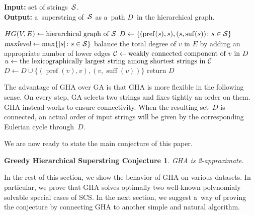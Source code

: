\documentclass[11pt,letterpaper]{article}
\DeclareMathOperator{\pref}{pref}
\DeclareMathOperator{\suff}{suff}
\begin{document}
\begin{algorithm}
\label{algo:gha}
\caption{Greedy Hierarchical Algorithm (GHA)}
\hspace*{\algorithmicindent} \textbf{Input:} set of strings~${\cal S}$.\\
\hspace*{\algorithmicindent} \textbf{Output:} a~superstring of~${\cal S}$ as a~path $D$~in the hierarchical graph.
\begin{algorithmic}[1]
\State $HG(V,E) \gets \text{hierarchical graph of ${\cal S}$}$ 
\State $D \gets \{(\operatorname{pref}(s), s), (s, \operatorname{suf}(s)) \colon s \in {\cal S}\}$\\
$\textsl{maxlevel} \gets \max\{|s| \colon s \in {\cal S}\}$
\State balance the total degree of $v$ in $E$ by adding an appropriate number of lower edges
\Else
\State ${\cal C} \gets \text{weakly connected component of $v$ in $D$}$
\State $u \gets \text{the lexicographically largest string among shortest strings in ${\cal C}$}$
\State $D \gets D \cup \{(\pref(v), v), (v, \suff(v))\}$
\EndIf
\EndIf
\EndFor
\State return $D$
\end{algorithmic}
\end{algorithm}


The advantage of GHA over GA is that GHA is more flexible in the following sense. On every step, GA selects two strings and fixes tightly an order on them. GHA instead works to ensure connectivity. When the resulting set~$D$ is connected, an actual order of input strings will be given by the corresponding Eulerian cycle through~$D$.


We are now ready to state the main conjecture of this paper.
\newtheorem*{ghcc}{Greedy Hierarchical Superstring Conjecture}
\begin{ghcc}
GHA is 2-approximate.
\end{ghcc}
In the rest of this section, we show the behavior of GHA on various datasets. In particular, we prove that GHA solves optimally two well-known polynomialy solvable special cases of SCS. In the next section, we suggest a~way of proving the conjecture by connecting GHA to another simple and natural algorithm.
\end{document}
